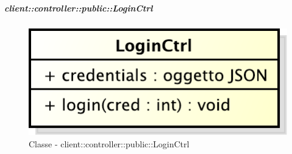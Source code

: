		\subparagraph{client::controller::public::LoginCtrl} %
		\label{subp:bdsm_app_client_controller_public_loginctrl}
			\begin{figure}[htbp]
				\centering
				\centerline{\includegraphics[scale=0.7]{./images/client/classes/controller/login_ctrl.pdf}}
				\caption{Classe - client::controller::public::LoginCtrl}
			\end{figure}
